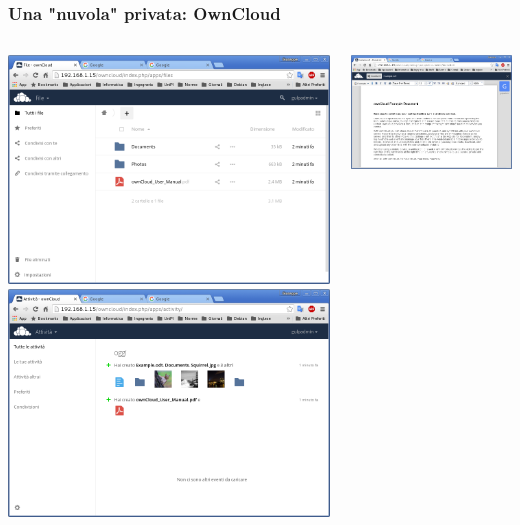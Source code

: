 \documentclass[11pt,xcolor=table]{beamer}
\begin{document}
\begin{frame}
	\frametitle{Una "nuvola" privata: OwnCloud}
	\begin{columns}
		\begin{column}{0.48\textwidth}
			\includegraphics[width=\textwidth]{OC/OC2.png}
			\vspace{1mm}
			\includegraphics[width=\textwidth]{OC/OC3.png}
		\end{column}
		\begin{column}{0.48\textwidth}
			\includegraphics[width=\textwidth]{OC/OC4.png}

\end{column}
\end{columns}
\end{frame}
\end{document}
